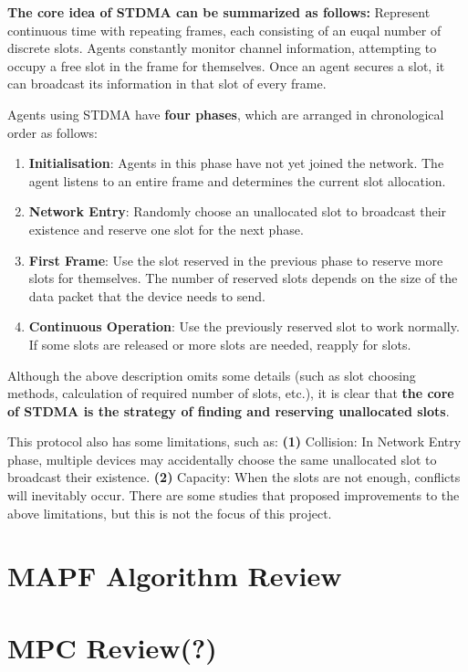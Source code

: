 \textbf{The core idea of STDMA can be summarized as follows:} Represent continuous time with repeating
frames, each consisting of an euqal number of discrete slots. Agents constantly monitor channel information,
attempting to occupy a free slot in the frame for themselves. Once an agent secures a slot, it can broadcast
its information in that slot of every frame.

Agents using STDMA have \textbf{four phases}, which are arranged in chronological order as follows:


\begin{enumerate}
  \item \textbf{Initialisation}: Agents in this phase have not yet joined the network. The agent listens to an entire frame and determines the current slot allocation.
  \item \textbf{Network Entry}:  Randomly choose an unallocated slot to broadcast their existence and reserve one slot for the next phase.
  \item \textbf{First Frame}: Use the slot reserved in the previous phase to reserve more slots for themselves. The number of reserved slots depends on the size of the data packet that the device needs to send.
  \item \textbf{Continuous Operation}: Use the previously reserved slot to work normally. If some slots are released or more slots are needed, reapply for slots.
\end{enumerate}

Although the above description omits some details (such as slot choosing methods,
 calculation of required number of slots, etc.), it is clear that
\textbf{the core of STDMA is the strategy of finding and reserving unallocated slots}.

This protocol also has some limitations, such as:
\textbf{(1)} Collision: In Network Entry phase, multiple devices may accidentally choose the same unallocated slot to broadcast their existence.
 \textbf{(2)} Capacity: When the slots are not enough, conflicts will inevitably occur. There are some studies \cite{STDMA_improv1,STDMA_improv2} that proposed improvements to the above limitations, but this is not the focus of this project.

\section{MAPF Algorithm Review}
\section{MPC Review(?)}
